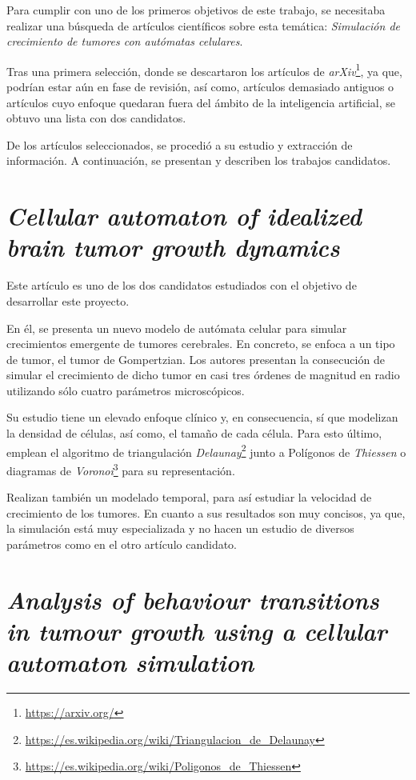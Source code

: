 Para cumplir con uno de los primeros objetivos de este trabajo, se necesitaba
realizar una búsqueda de artículos científicos sobre esta temática:
\textit{Simulación de crecimiento de tumores con autómatas celulares}.

Tras una primera selección, donde se descartaron los artículos de \textit{arXiv}\footnote{\url{https://arxiv.org/}},
ya que, podrían estar aún en fase de revisión, así como, artículos demasiado antiguos o artículos
cuyo enfoque quedaran fuera del ámbito de la inteligencia artificial, se obtuvo una lista
con dos candidatos.

De los artículos seleccionados, se procedió a su estudio y extracción de información. A continuación,
se presentan y describen los trabajos candidatos.

\section{\textit{Cellular automaton of idealized brain tumor growth dynamics}}

Este artículo \cite{kansal-torquato} es uno de los dos candidatos estudiados con el objetivo
de desarrollar este proyecto.

En él, se presenta un nuevo modelo de autómata celular para simular crecimientos emergente de tumores cerebrales.
En concreto, se enfoca a un tipo de tumor, el tumor de Gompertzian. Los autores presentan
la consecución de simular el crecimiento de dicho tumor en casi tres órdenes de magnitud en radio
utilizando sólo cuatro parámetros microscópicos.

Su estudio tiene un elevado enfoque clínico y, en consecuencia, sí que modelizan la densidad de células, así como,
el tamaño de cada célula. Para esto último, emplean el algoritmo de triangulación \textit{Delaunay}\footnote{\url{https://es.wikipedia.org/wiki/Triangulacion_de_Delaunay}}
junto a Polígonos de \textit{Thiessen} o diagramas de \textit{Voronoi}\footnote{\url{https://es.wikipedia.org/wiki/Poligonos_de_Thiessen}} para su representación.

Realizan también un modelado temporal, para así estudiar la velocidad de crecimiento de los tumores. En cuanto a sus resultados son muy concisos, ya que,
la simulación está muy especializada y no hacen un estudio de diversos parámetros como en el otro artículo candidato.

\section{\textit{Analysis of behaviour transitions in tumour growth
using a cellular automaton simulation}}

